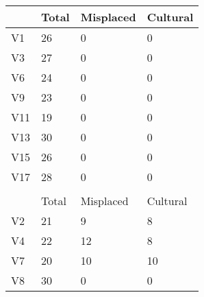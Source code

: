     \begin{table}[ht]
    \begin{tabular}{llll}
    \cline{2-4}
    \multicolumn{1}{l|}{}     & \multicolumn{1}{l|}{Total} & \multicolumn{1}{l|}{Misplaced} & \multicolumn{1}{l|}{Cultural} \\ \hline
    \multicolumn{1}{|l|}{V1}  & \multicolumn{1}{l|}{26}    & \multicolumn{1}{l|}{0}         & \multicolumn{1}{l|}{0}        \\ \hline
    \multicolumn{1}{|l|}{V3}  & \multicolumn{1}{l|}{27}    & \multicolumn{1}{l|}{0}         & \multicolumn{1}{l|}{0}        \\ \hline
    \multicolumn{1}{|l|}{V6}  & \multicolumn{1}{l|}{24}    & \multicolumn{1}{l|}{0}         & \multicolumn{1}{l|}{0}        \\ \hline
    \multicolumn{1}{|l|}{V9}  & \multicolumn{1}{l|}{23}    & \multicolumn{1}{l|}{0}         & \multicolumn{1}{l|}{0}        \\ \hline
    \multicolumn{1}{|l|}{V11} & \multicolumn{1}{l|}{19}    & \multicolumn{1}{l|}{0}         & \multicolumn{1}{l|}{0}        \\ \hline
    \multicolumn{1}{|l|}{V13} & \multicolumn{1}{l|}{30}    & \multicolumn{1}{l|}{0}         & \multicolumn{1}{l|}{0}        \\ \hline
    \multicolumn{1}{|l|}{V15} & \multicolumn{1}{l|}{26}    & \multicolumn{1}{l|}{0}         & \multicolumn{1}{l|}{0}        \\ \hline
    \multicolumn{1}{|l|}{V17} & \multicolumn{1}{l|}{28}    & \multicolumn{1}{l|}{0}         & \multicolumn{1}{l|}{0}        \\ \hline
                              &                            &                                &                               \\ \cline{2-4} 
    \multicolumn{1}{l|}{}     & \multicolumn{1}{l|}{Total} & \multicolumn{1}{l|}{Misplaced} & \multicolumn{1}{l|}{Cultural} \\ \hline
    \multicolumn{1}{|l|}{V2}  & \multicolumn{1}{l|}{21}    & \multicolumn{1}{l|}{9}         & \multicolumn{1}{l|}{8}        \\ \hline
    \multicolumn{1}{|l|}{V4}  & \multicolumn{1}{l|}{22}    & \multicolumn{1}{l|}{12}        & \multicolumn{1}{l|}{8}        \\ \hline
    \multicolumn{1}{|l|}{V7}  & \multicolumn{1}{l|}{20}    & \multicolumn{1}{l|}{10}        & \multicolumn{1}{l|}{10}       \\ \hline
    \multicolumn{1}{|l|}{V8}  & \multicolumn{1}{l|}{30}    & \multicolumn{1}{l|}{0}         & \multicolumn{1}{l|}{0}        \\ \hline

\end{tabular}
\end{table}
